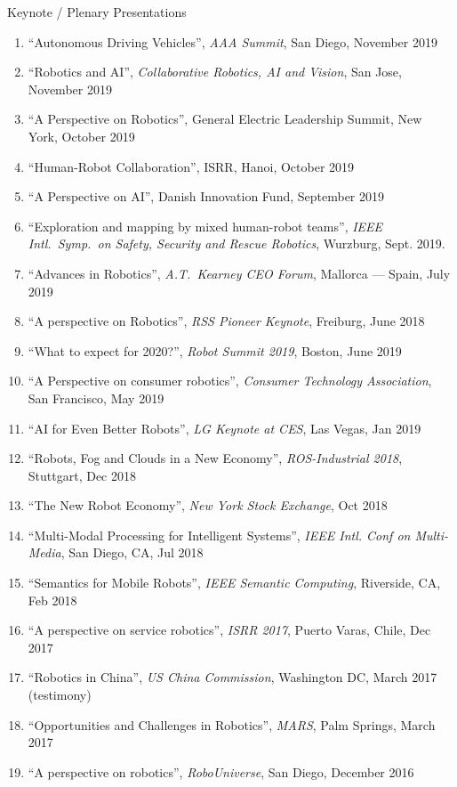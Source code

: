 \documentclass{article}
\begin{document}
\begin{cv}
\begin{cvlist}{Keynote / Plenary Presentations}
\begin{enumerate}
			      December 2019
			\item ``Autonomous Driving Vehicles'', {\em AAA Summit}, San Diego, November
			      2019
			\item ``Robotics and AI'', {\em Collaborative Robotics, AI and Vision}, San
			      Jose, November 2019
			\item ``A Perspective on Robotics'', General Electric Leadership Summit, New
			      York, October 2019
			\item ``Human-Robot Collaboration'', ISRR, Hanoi, October 2019
			\item ``A Perspective on AI'', Danish Innovation Fund, September 2019
			\item ``Exploration and mapping by mixed human-robot teams'', {\em
				      IEEE Intl.\ Symp.\ on Safety, Security and Rescue Robotics}, Wurzburg, Sept. 2019.
			\item  ``Advances in Robotics'', {\em A.T.\ Kearney CEO Forum}, Mallorca --- Spain, July 2019
			\item ``A perspective on Robotics'', {\em RSS Pioneer Keynote}, Freiburg, June 2018
			\item ``What to expect for 2020?'', {\em Robot Summit 2019}, Boston, June 2019
			\item ``A Perspective on consumer robotics'', {\em Consumer Technology Association}, San Francisco, May 2019
			\item ``AI for Even Better Robots'', {\em LG Keynote at CES}, Las Vegas, Jan 2019
			\item ``Robots, Fog and Clouds in a New Economy'', {\em ROS-Industrial 2018}, Stuttgart, Dec 2018
			\item ``The New Robot Economy'', {\em New York Stock Exchange}, Oct 2018
			\item ``Multi-Modal Processing for Intelligent Systems'', {\em IEEE Intl. Conf on Multi-Media},
			      San Diego, CA, Jul 2018
			\item ``Semantics for Mobile Robots'', {\em IEEE Semantic Computing}, Riverside, CA, Feb 2018
			\item ``A perspective on service robotics'', {\em ISRR 2017}, Puerto Varas, Chile, Dec 2017
			\item ``Robotics in China'', {\em US China Commission}, Washington DC, March 2017 (testimony)
			\item ``Opportunities and Challenges in Robotics'', {\em MARS}, Palm Springs, March 2017
			\item ``A perspective on robotics'', {\em RoboUniverse}, San Diego,  December 2016

\end{enumerate}
\end{cvlist}
\end{cv}
\end{document}
